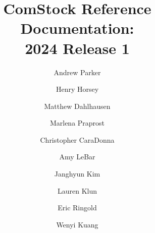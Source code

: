 \documentclass[]{nrel}
\title{ComStock Reference Documentation: \\ 2024 Release 1}
\author{Andrew Parker}
\author{Henry Horsey}
\author{Matthew Dahlhausen}
\author{Marlena Praprost}
\author{Christopher CaraDonna}
\author{Amy LeBar}
\author{Janghyun Kim}
\author{Lauren Klun}
\author{Eric Ringold}
\author{Wenyi Kuang}
\affil{National Renewable Energy Laboratory}
\begin{document}
\frontmatter





\mainmatter
\tableofcontents

\listoffigures

\listoftables




\label{chap:3_sampling}












\cleardoublepage
\label{sec:Bib}
\printbibliography[title={\LARGE References}]
\begin{appendices} %




\end{appendices}
\end{document}
